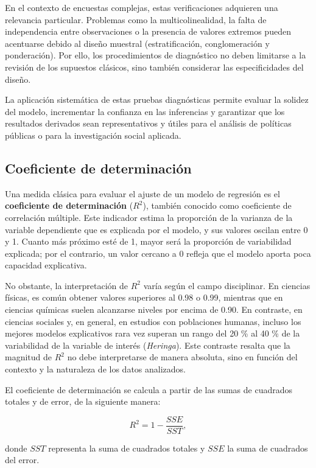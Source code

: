 \documentclass[
  spanish,
  12pt,
]{book}
\begin{document}
En el contexto de encuestas complejas, estas verificaciones adquieren una relevancia particular. Problemas como la multicolinealidad, la falta de independencia entre observaciones o la presencia de valores extremos pueden acentuarse debido al diseño muestral (estratificación, conglomeración y ponderación). Por ello, los procedimientos de diagnóstico no deben limitarse a la revisión de los supuestos clásicos, sino también considerar las especificidades del diseño.

La aplicación sistemática de estas pruebas diagnósticas permite evaluar la solidez del modelo, incrementar la confianza en las inferencias y garantizar que los resultados derivados sean representativos y útiles para el análisis de políticas públicas o para la investigación social aplicada.

\subsection{Coeficiente de determinación}\label{coeficiente-de-determinaciuxf3n}

Una medida clásica para evaluar el ajuste de un modelo de regresión es el \textbf{coeficiente de determinación} (\(R^{2}\)), también conocido como coeficiente de correlación múltiple. Este indicador estima la proporción de la varianza de la variable dependiente que es explicada por el modelo, y sus valores oscilan entre 0 y 1. Cuanto más próximo esté de 1, mayor será la proporción de variabilidad explicada; por el contrario, un valor cercano a 0 refleja que el modelo aporta poca capacidad explicativa.

No obstante, la interpretación de \(R^{2}\) varía según el campo disciplinar. En ciencias físicas, es común obtener valores superiores al 0.98 o 0.99, mientras que en ciencias químicas suelen alcanzarse niveles por encima de 0.90. En contraste, en ciencias sociales y, en general, en estudios con poblaciones humanas, incluso los mejores modelos explicativos rara vez superan un rango del 20 \% al 40 \% de la variabilidad de la variable de interés (\emph{Heringa}). Este contraste resalta que la magnitud de \(R^{2}\) no debe interpretarse de manera absoluta, sino en función del contexto y la naturaleza de los datos analizados.

El coeficiente de determinación se calcula a partir de las sumas de cuadrados totales y de error, de la siguiente manera:

\[
R^{2} = 1 - \frac{SSE}{SST},
\]

donde \(SST\) representa la suma de cuadrados totales y \(SSE\) la suma de cuadrados del error.
\end{document}
